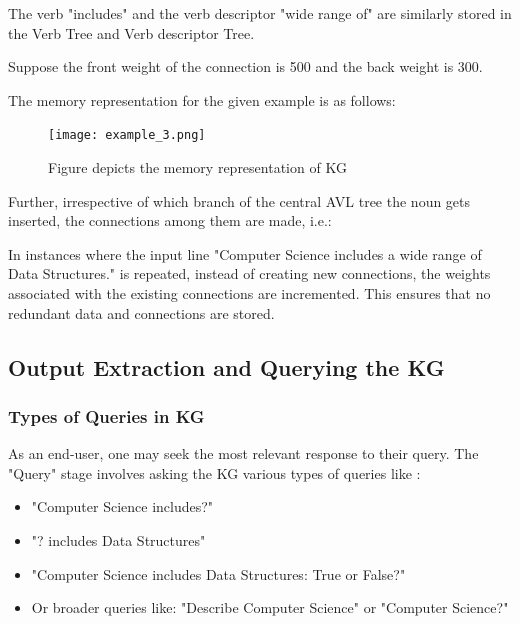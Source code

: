\documentclass[conference]{IEEEtran}
\begin{document}
The verb "includes" and the verb descriptor "wide range of" are similarly stored in the Verb Tree and Verb descriptor Tree.

Suppose the front weight of the connection is 500 and the back weight is 300.

The memory representation for the given example is as follows: 

\begin{figure}[htbp]
\centerline{\texttt{[image: example\_3.png]}}
\caption{Figure depicts the memory representation of KG}
\label{fig}
\end{figure}

Further, irrespective of which branch of the central AVL tree the noun gets inserted, 
the connections among them are made, i.e.:



In instances where the input line "Computer Science includes a wide range of Data Structures." is 
repeated, instead of creating new connections, the weights associated with the existing connections 
are incremented. This ensures that no redundant data and connections are stored.


\subsection{\textbf{Output Extraction and Querying the KG}}

\subsubsection{Types of Queries in KG}

As an end-user, one may seek the most relevant response to their query. The "Query" stage involves asking the KG various types of queries like :
\begin{itemize}
    \item "Computer Science includes?"
    \item "? includes Data Structures"
    \item "Computer Science includes Data Structures: True or False?"
    \item Or broader queries like: "Describe Computer Science" or "Computer Science?"
\end{itemize}
\end{document}
